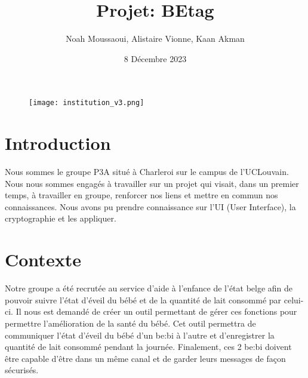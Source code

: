 \documentclass [11pt]{article}
\title{\textbf{Projet: BEtag}}
\author{Noah Moussaoui, Alistaire Vionne, Kaan Akman}
\date{8 Décembre 2023}
\begin{document}
\maketitle
\begin{figure}[h]
    \centering
    \texttt{[image: institution\_v3.png]}
    \label{ucl}
\end{figure}

\section{Introduction}
Nous sommes le groupe P3A situé à Charleroi sur le campus de l’UCLouvain. Nous nous sommes
engagés à travailler sur un projet qui visait, dans un premier temps, à travailler en groupe, renforcer nos
liens et mettre en commun nos connaissances. Nous avons pu prendre connaissance sur l'UI (User Interface), la cryptographie et les appliquer.

\section{Contexte}
Notre groupe a été recrutée au service d’aide à l’enfance de l’état belge afin de pouvoir suivre l’état d’éveil du bébé et de la quantité de lait consommé par celui-ci. Il nous est demandé de créer un outil permettant de gérer ces fonctions pour permettre l’amélioration de la santé du bébé. Cet outil permettra de communiquer l’état d’éveil du bébé d’un be\string:bi à l’autre et d’enregistrer la quantité de lait consommé pendant la journée. Finalement, ces 2 be\string:bi doivent être capable d’être dans un même canal et de garder leurs messages de façon sécurisés.

\newpage
\end{document}
